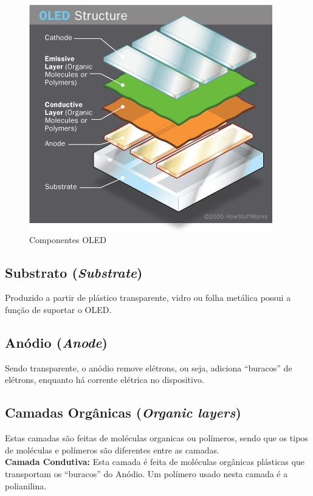\begin{figure}[!ht]
  \centering
  \includegraphics[width=.40\textwidth]{./figuras/camadas_oled} 
  \caption{Componentes OLED}
  \label{fig:camadas_oled} 
\end{figure}


\subsection{Substrato (\textit{Substrate})}
\label{sec:substrato}

Produzido a partir de plástico transparente, vidro ou folha metálica possui a função de suportar o OLED.


\subsection{Anódio (\textit{Anode})}
\label{sec:anodo}

Sendo transparente, o anódio remove elétrons, ou seja, adiciona  ``buracos''  de elétrons, enquanto há corrente elétrica no dispositivo.


\subsection{Camadas Orgânicas (\textit{Organic layers})}
\label{sec:camadasorganicas}

Estas camadas são feitas de moléculas organicas ou polímeros, sendo que os tipos de moléculas e polímeros são diferentes entre as camadas.\\

{\bf Camada Condutiva:} Esta camada é feita de moléculas orgânicas plásticas que transportam os ``buracos'' do Anódio. Um polímero usado nesta camada é a polianilina.\\


